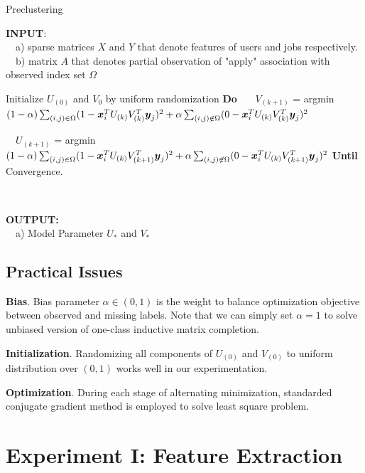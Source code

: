 \documentclass{article} %
\begin{document}
\begin{algorithm}
    \caption{Preclustering}
    \label{alg:preclustering}
    \begin{algorithmic}[1]

\State \textbf{INPUT}: \\ \ \ a) sparse matrices $X$ and $Y$ that denote features of users
and jobs respectively. \\ \ \ b) matrix $A$ that denotes partial observation
of "apply" association with observed index set $\Omega$ \State \

\State Initialize $U_{(0)}$ and $V_{0}$ by uniform randomization
\State \textbf{Do}  
\State \ \ \
$V_{(k+1)}$ = argmin $(1-\alpha) \sum_{(i,j) \in \Omega} 
    (1- \boldsymbol{x}_i^T U_{(k)} V_{(k)}^T \boldsymbol{y}_j)^2 
    + \alpha \sum_{(i,j) \not \in \Omega} (0 - \boldsymbol{x}_i^T U_{(k)} V_{(k)}^T \boldsymbol{y}_j)^2$

\State \  \
$U_{(k+1)}$ = argmin $(1-\alpha) \sum_{(i,j) \in \Omega}
    (1-\boldsymbol{x}_i^T U_{(k)} V_{(k+1)}^T \boldsymbol{y}_j)^2 +
    \alpha \sum_{(i,j) \not \in \Omega}
    (0-\boldsymbol{x}_i^T U_{(k)} V_{(k+1)}^T \boldsymbol{y}_j)^2$
\State \textbf{Until} Convergence. 

\State \

\State \textbf{OUTPUT: } \\ 
\ \ a) Model Parameter $ U_{*}$ and $V_{*}$ 
\end{algorithmic}
\end{algorithm}


\subsection{Practical Issues}
\textbf{Bias}. Bias parameter $\alpha \in (0, 1)$ is the weight to balance
optimization objective between observed and missing labels. Note that we can
simply set $\alpha = 1$ to solve unbiased version of one-class inductive matrix completion.

\textbf{Initialization}. Randomizing all components of $U_{(0)}$ and
$V_{(0)}$ to uniform distribution over $(0, 1)$ works well in our
experimentation. 

\textbf{Optimization}.
During each stage of alternating minimization, standarded conjugate gradient method is
employed to solve least square problem. 

\section{Experiment I: Feature Extraction} %
\end{document}
